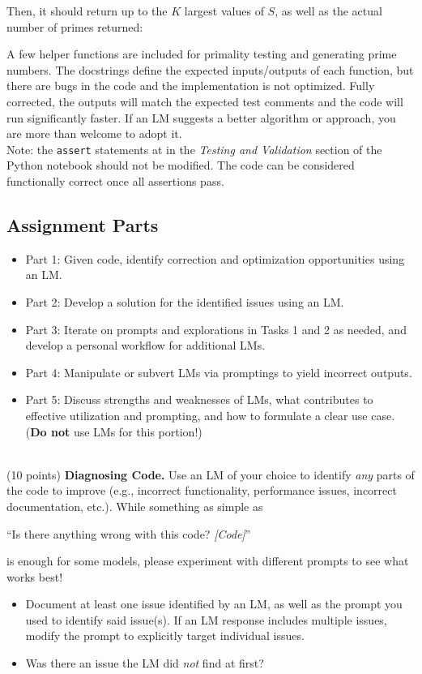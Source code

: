 \documentclass[a4 paper]{article}
\numberwithin{equation}{section}
\newcommand{\problem}[2]{~\\\fbox{\textbf{Part #1}}\hfill (#2 points)\newline\newline}
\begin{document}
Then, it should return up to the $K$ largest values of $S$, as well as the actual number of primes returned:

A few helper functions are included for primality testing and generating prime numbers.
The docstrings define the expected inputs/outputs of each function, but there are bugs in the code and the implementation is not optimized.
Fully corrected, the outputs will match the expected test comments and the code will run significantly faster.
If an LM suggests a better algorithm or approach, you are more than welcome to adopt it.\\

Note: the \texttt{assert} statements at in the \textit{Testing and Validation} section of the Python notebook should not be modified.
The code can be considered functionally correct once all assertions pass.

\subsection*{Assignment Parts}
\begin{itemize}
    \item Part 1: Given code, identify correction and optimization opportunities using an LM.
    \item Part 2: Develop a solution for the identified issues using an LM.
    \item Part 3: Iterate on prompts and explorations in Tasks 1 and 2 as needed, and develop a personal workflow for additional LMs.
    \item Part 4: Manipulate or subvert LMs via promptings to yield incorrect outputs.
    \item Part 5: Discuss strengths and weaknesses of LMs, what contributes to effective utilization and prompting, and how to formulate a clear use case. (\textbf{Do not} use LMs for this portion!)
\end{itemize}


\newpage
\problem{1}{10}
\textbf{Diagnosing Code.}
Use an LM of your choice to identify \textit{any} parts of the code to improve (e.g., incorrect functionality, performance issues, incorrect documentation, etc.).
While something as simple as
\begin{center}
``Is there anything wrong with this code? \textit{[Code]}''
\end{center}
is enough for some models, please experiment with different prompts to see what works best!

\begin{itemize}
    \item Document at least one issue identified by an LM, as well as the prompt you used to identify said issue(s). If an LM response includes multiple issues, modify the prompt to explicitly target individual issues.
    \item Was there an issue the LM did \textit{not} find at first?
\end{itemize}
\end{document}
